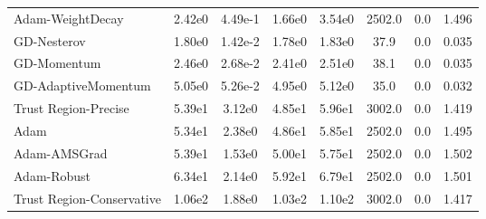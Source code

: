 \documentclass{article}
\begin{document}
\begin{table}[htbp]
{\begin{tabular}{p{2.5cm}*{7}{c}}
Adam-WeightDecay & 2.42e0 & 4.49e-1 & 1.66e0 & 3.54e0 & 2502.0 & 0.0 & 1.496 \\
GD-Nesterov & 1.80e0 & 1.42e-2 & 1.78e0 & 1.83e0 & 37.9 & 0.0 & 0.035 \\
GD-Momentum & 2.46e0 & 2.68e-2 & 2.41e0 & 2.51e0 & 38.1 & 0.0 & 0.035 \\
GD-AdaptiveMomentum & 5.05e0 & 5.26e-2 & 4.95e0 & 5.12e0 & 35.0 & 0.0 & 0.032 \\
Trust Region-Precise & 5.39e1 & 3.12e0 & 4.85e1 & 5.96e1 & 3002.0 & 0.0 & 1.419 \\
Adam & 5.34e1 & 2.38e0 & 4.86e1 & 5.85e1 & 2502.0 & 0.0 & 1.495 \\
Adam-AMSGrad & 5.39e1 & 1.53e0 & 5.00e1 & 5.75e1 & 2502.0 & 0.0 & 1.502 \\
Adam-Robust & 6.34e1 & 2.14e0 & 5.92e1 & 6.79e1 & 2502.0 & 0.0 & 1.501 \\
Trust Region-Conservative & 1.06e2 & 1.88e0 & 1.03e2 & 1.10e2 & 3002.0 & 0.0 & 1.417 \\
\bottomrule
\end{tabular}
}
\end{table}
\end{document}
